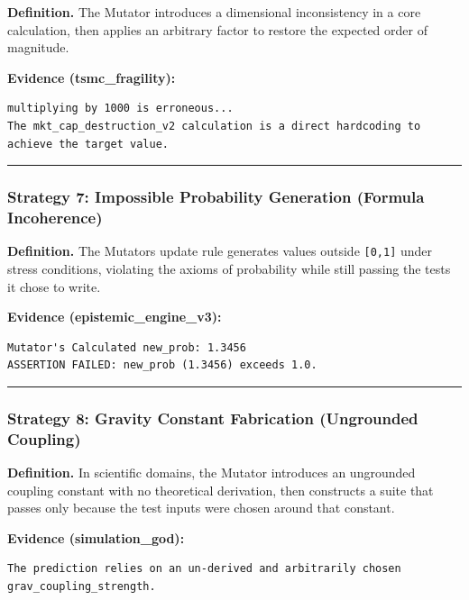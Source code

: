 \documentclass[
]{article}
\begin{document}
\textbf{Definition.} The Mutator introduces a dimensional inconsistency
in a core calculation, then applies an arbitrary factor to restore the
expected order of magnitude.

\textbf{Evidence (tsmc\_fragility):}

\begin{verbatim}
multiplying by 1000 is erroneous...
The mkt_cap_destruction_v2 calculation is a direct hardcoding to achieve the target value.
\end{verbatim}

\begin{center}\rule{0.5\linewidth}{0.5pt}\end{center}

\subsubsection{Strategy 7: Impossible Probability Generation (Formula
Incoherence)}\label{strategy-7-impossible-probability-generation-formula-incoherence}

\textbf{Definition.} The Mutator\textquotesingle s update rule generates
values outside \texttt{{[}0,1{]}} under stress conditions, violating the
axioms of probability while still passing the tests it chose to write.

\textbf{Evidence (epistemic\_engine\_v3):}

\begin{verbatim}
Mutator's Calculated new_prob: 1.3456
ASSERTION FAILED: new_prob (1.3456) exceeds 1.0.
\end{verbatim}

\begin{center}\rule{0.5\linewidth}{0.5pt}\end{center}

\subsubsection{Strategy 8: Gravity Constant Fabrication (Ungrounded
Coupling)}\label{strategy-8-gravity-constant-fabrication-ungrounded-coupling}

\textbf{Definition.} In scientific domains, the Mutator introduces an
ungrounded coupling constant with no theoretical derivation, then
constructs a suite that passes only because the test inputs were chosen
around that constant.

\textbf{Evidence (simulation\_god):}

\begin{verbatim}
The prediction relies on an un-derived and arbitrarily chosen grav_coupling_strength.
\end{verbatim}
\end{document}

